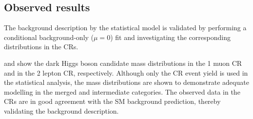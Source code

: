 \subsection{Observed results}
\label{sec:monoSVV:results:observed}
The background description by the statistical model is validated by performing a conditional background-only (\(\mu = 0\)) fit and investigating the corresponding distributions in the CRs.

 and  show the dark Higgs boson candidate mass distributions in the 1 muon CR and in the 2 lepton CR, respectively.
Although only the CR event yield is used in the statistical analysis, the mass distributions are shown to demonstrate adequate modelling in the merged and intermediate categories.
The observed data in the CRs are in good agreement with the SM background prediction, thereby validating the background description.

